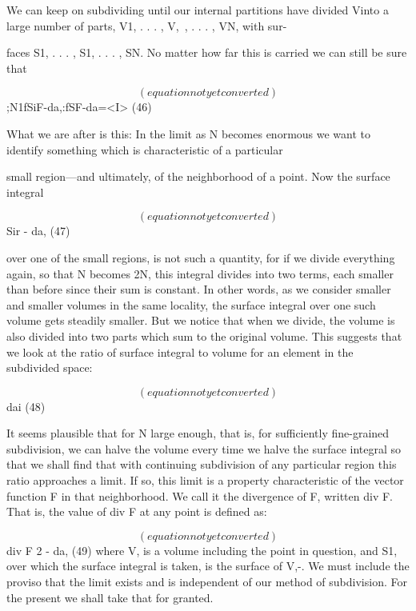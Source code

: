 We can keep on subdividing until our internal partitions have
divided Vinto a large number of parts, V1, . . . , V,~, . . . , VN, with sur-

faces S1, . . . , S1, . . . , SN. No matter how far this is carried we can
still be sure that

\begin{equation}
(equation not yet converted)
\end{equation}
;N1fSiF-da,:fSF-da=<I> (46)

What we are after is this: In the limit as N becomes enormous we
want to identify something which is characteristic of a particular

small region---and ultimately, of the neighborhood of a point. Now
the surface integral

\begin{equation}
(equation not yet converted)
\end{equation}
Sir - da, (47)

over one of the small regions, is not such a quantity, for if we divide
everything again, so that N becomes 2N, this integral divides into two
terms, each smaller than before since their sum is constant. In other
words, as we consider smaller and smaller volumes in the same
locality, the surface integral over one such volume gets steadily
smaller. But we notice that when we divide, the volume is also
divided into two parts which sum to the original volume. This suggests
that we look at the ratio of surface integral to volume for an
element in the subdivided space:

\begin{equation}
(equation not yet converted)
\end{equation}
 dai (48)

It seems plausible that for N large enough, that is, for sufficiently
fine-grained subdivision, we can halve the volume every time we
halve the surface integral so that we shall find that with continuing
subdivision of any particular region this ratio approaches a limit. If
so, this limit is a property characteristic of the vector function F in
that neighborhood. We call it the divergence of F, written div F.
That is, the value of div F at any point is defined as:

\begin{equation}
(equation not yet converted)
\end{equation}
div F 2  - da, (49)
where V, is a volume including the point in question, and S1, over
which the surface integral is taken, is the surface of V,-. We must include
the proviso that the limit exists and is independent of our
method of subdivision. For the present we shall take that for
granted.

